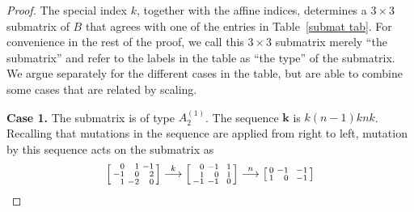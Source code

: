 \documentclass{amsart}
\theoremstyle{definition}
\theoremstyle{remark}
\numberwithin{equation}{section}
\newcommand{\0}{{\mathbf{0}}}
\newcommand{\kk}{{\boldsymbol{k}}}
\begin{document}
\begin{proof}
The special index $k$, together with the affine indices, determines a $3\times3$ submatrix of $B$ that agrees with one of the entries in Table~\ref{submat tab}.
For convenience in the rest of the proof, we call this $3\times3$ submatrix merely ``the submatrix'' and refer to the labels in the table as ``the type'' of the submatrix.
We argue separately for the different cases in the table, but are able to combine some cases that are related by scaling.

\medskip

\noindent
\textbf{Case 1.}
The submatrix is of type $A_2^{(1)}$.
The sequence $\kk$ is $k(n-1)knk$.
Recalling that mutations in the sequence are applied from right to left, mutation by this sequence acts on the submatrix as
\begin{multline*}
\begin{bsmallmatrix*}[r]
0&1&-1\\
-1&0&2\\
1&-2&0
\end{bsmallmatrix*}
\overset{k}{\longrightarrow}
\begin{bsmallmatrix*}[r]
0&-1&\,\,\,1\\
1&0&1\\
-1&-1&0
\end{bsmallmatrix*}
\overset{n}{\longrightarrow}
\begin{bsmallmatrix*}[r]
0&-1&\,\,\,-1\\
1&0&-1\\

\end{bsmallmatrix*}
\end{multline*}
\end{proof}
\end{document}
